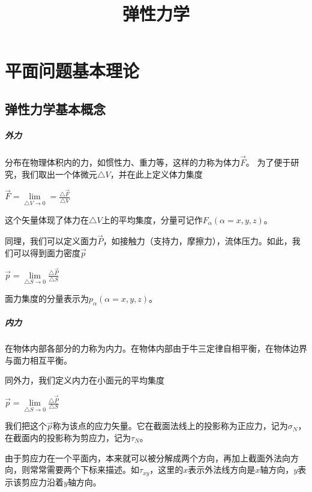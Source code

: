 \documentclass{ctexbook}
\title{弹性力学}
\begin{document}
	\chapter{平面问题基本理论}
	\section{弹性力学基本概念}
	\paragraph{外力}
	分布在物理体积内的力，如惯性力、重力等，这样的力称为体力$\vec{F}$。
	为了便于研究，我们取出一个体微元$\bigtriangleup V$，并在此上定义体力集度
	
	$\vec{F}=\lim\limits_{\bigtriangleup V\to 0}=\frac{\bigtriangleup \vec{F}}{\bigtriangleup V}$
	
	这个矢量体现了体力在$\bigtriangleup V$上的平均集度，分量可记作$F_{\alpha} (\alpha=x,y,z)$。
	
	同理，我们可以定义面力$\vec{P}$，如接触力（支持力，摩擦力），流体压力。如此，我们可以得到面力密度$\vec{p}$
	
	$\vec{p}=\lim\limits_{\bigtriangleup S\to 0}\frac{\bigtriangleup \vec{P}}{\bigtriangleup S}$
	
	面力集度的分量表示为$p_{\alpha} (\alpha=x,y,z)$。
	\paragraph{内力}
	在物体内部各部分的力称为内力。在物体内部由于牛三定律自相平衡，在物体边界与面力相互平衡。
	
	同外力，我们定义内力在小面元的平均集度
	
	$\vec{p}=\lim\limits_{\bigtriangleup S\to 0}\frac{\bigtriangleup \vec{P}}{\bigtriangleup S}$
	
	我们把这个$\vec{p}$称为该点的应力矢量。它在截面法线上的投影称为正应力，记为$\sigma_{N}$，在截面内的投影称为剪应力，记为$\tau_{N}$。
	
	由于剪应力在一个平面内，本来就可以被分解成两个方向，再加上截面外法向方向，则常常需要两个下标来描述。如$\tau_{xy}$，这里的$x$表示外法线方向是$x$轴方向，$y$表示该剪应力沿着$y$轴方向。
	
\end{document}
